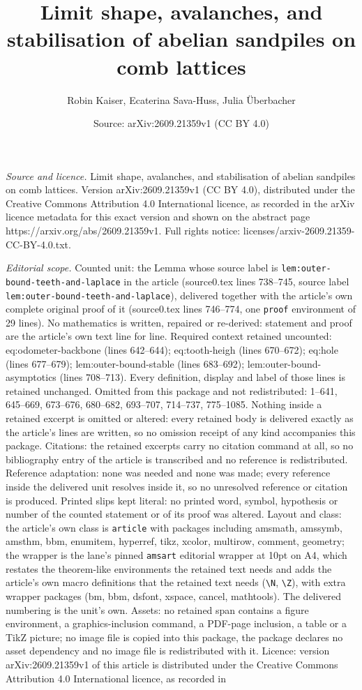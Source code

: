 \documentclass[10pt,a4paper]{amsart}
\title[Limit shape, avalanches, and stabilisation of abelian sandpi]{Limit shape, avalanches, and stabilisation of abelian sandpiles on comb lattices}
\author{Robin Kaiser, Ecaterina Sava-Huss, Julia \"Uberbacher}
\date{Source: arXiv:2609.21359v1 (CC BY 4.0)}
\begin{document}
\maketitle

\noindent\emph{Source and licence.} Limit shape, avalanches, and stabilisation of abelian sandpiles on comb lattices. Version arXiv:2609.21359v1 (CC BY 4.0), distributed under the Creative Commons Attribution 4.0 International licence, as recorded in the arXiv licence metadata for this exact version and shown on the abstract page https://arxiv.org/abs/2609.21359v1. Full rights notice: licenses/arxiv-2609.21359-CC-BY-4.0.txt.\par\smallskip

\noindent\textit{Editorial scope.} Counted unit: the Lemma whose source label is \texttt{lem:outer-bound-teeth-and-laplace} in the article (source0.tex lines 738--745, source label \texttt{lem:outer-bound-teeth-and-laplace}), delivered together with the article's own complete original proof of it (source0.tex lines 746--774, one \texttt{proof} environment of 29 lines). No mathematics is written, repaired or re-derived: statement and proof are the article's own text line for line. Required context retained uncounted: eq:odometer-backbone (lines 642--644); eq:tooth-heigh (lines 670--672); eq:hole (lines 677--679); lem:outer-bound-stable (lines 683--692); lem:outer-bound-asymptotics (lines 708--713). Every definition, display and label of those lines is retained unchanged. Omitted from this package and not redistributed: 1--641, 645--669, 673--676, 680--682, 693--707, 714--737, 775--1085. Nothing inside a retained excerpt is omitted or altered: every retained body is delivered exactly as the article's lines are written, so no omission receipt of any kind accompanies this package. Citations: the retained excerpts carry no citation command at all, so no bibliography entry of the article is transcribed and no reference is redistributed. Reference adaptation: none was needed and none was made; every reference inside the delivered unit resolves inside it, so no unresolved reference or citation is produced. Printed slips kept literal: no printed word, symbol, hypothesis or number of the counted statement or of its proof was altered. Layout and class: the article's own class is \texttt{article} with packages including amsmath, amssymb, amsthm, bbm, enumitem, hyperref, tikz, xcolor, multirow, comment, geometry; the wrapper is the lane's pinned \texttt{amsart} editorial wrapper at 10pt on A4, which restates the theorem-like environments the retained text needs and adds the article's own macro definitions that the retained text needs (\texttt{\textbackslash N}, \texttt{\textbackslash Z}), with extra wrapper packages (bm, bbm, dsfont, xspace, cancel, mathtools). The delivered numbering is the unit's own. Assets: no retained span contains a figure environment, a graphics-inclusion command, a PDF-page inclusion, a table or a TikZ picture; no image file is copied into this package, the package declares no asset dependency and no image file is redistributed with it. Licence: version arXiv:2609.21359v1 of this article is distributed under the Creative Commons Attribution 4.0 International licence, as recorded in 
\end{document}
